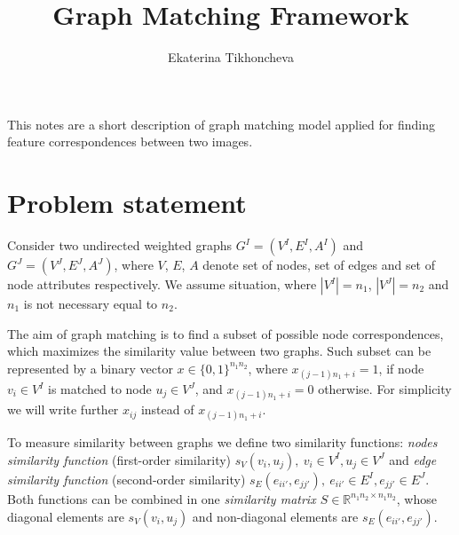 \documentclass[
	fontsize=12pt,
	paper=a4,
	twoside=false,
	numbers=noenddot,
	plainheadsepline,
	toc=listof,
	toc=bibliography
]{scrartcl}
\begin{document}
\pagestyle{plain}

\title{Graph Matching Framework}
\author{Ekaterina Tikhoncheva}
\date{} 

\maketitle 

This notes are a short description of graph matching model applied for finding feature correspondences between two images.

\tableofcontents
\newpage

\section{Problem statement}
Consider two undirected weighted graphs $G^I = (V^I, E^I, A^I)$ and $G^J = (V^J, E^J, A^J)$, where $V$, $E$, $A$ denote set of nodes,
set of edges and set of node attributes respectively. We assume situation, where $|V^I|=n_1$, $|V^J|=n_2$ and $n_1$ is not necessary equal to $n_2$.

The aim of graph matching is to find a subset of possible node correspondences, which maximizes the similarity value between two graphs. Such subset can be represented by a binary vector $x\in \{0,1\}^{n_1n_2}$, where $x_{(j-1)n_1+i}=1$, if node $v_i\in V^I$ is matched to node $u_j\in V^J$, and $x_{(j-1)n_1+i}=0$ otherwise. For simplicity we will write further $x_{ij}$ instead of $x_{(j-1)n_1+i}$.

To measure similarity between graphs we define two similarity functions: \emph{nodes similarity function} (first-order similarity) $s_V(v_i, u_j),\ v_i\in V^I, u_j\in V^J$ and \emph{edge similarity function} (second-order similarity) $s_E(e_{ii'}, e_{jj'}),\ e_{ii'}\in E^I, e_{jj'}\in E^J$. Both functions can be combined in one \emph{similarity matrix $S\in\mathbb{R}^{n_1n_2\times n_1n_2}$}, whose diagonal elements are $s_V(v_i, u_j)$ and non-diagonal elements are $s_E(e_{ii'}, e_{jj'})$.
\end{document}
